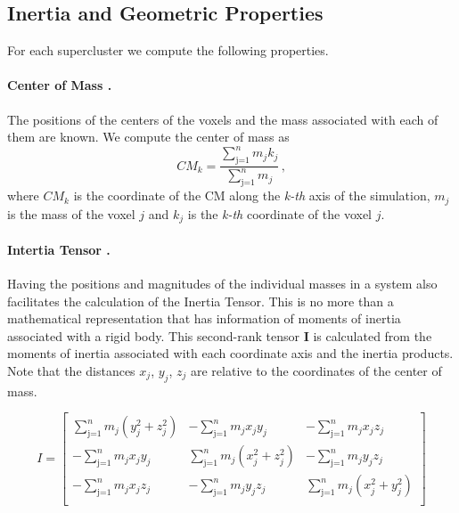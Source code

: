 \documentclass[a4paper,fleqn,usenatbib]{mnras}
\begin{document}
\subsection{Inertia and Geometric Properties}
\label{sec:IN}
For each supercluster we compute the following properties.
\paragraph{Center of Mass .} 
The positions of the centers of the voxels and the mass associated with each of them are known. We compute the center of mass as 
\begin{equation}
    CM_k = \frac{\sum\limits^{n}_{\text{j=1}} m_j k_j}{\sum\limits^{n}_{\text{j=1}} m_j} \,,
\end{equation}
where $CM_k$ is the coordinate of the CM along the \emph{k-th} axis of the simulation, $m_j$ is the mass of the voxel $j$ and $k_j$ is the \emph{k-th} coordinate of the voxel $j$. 


\paragraph{Intertia Tensor .}
Having the positions and magnitudes of the individual masses in a system also facilitates the calculation of the Inertia Tensor. This is no more than a mathematical representation that has information of moments of inertia associated with a rigid body. This second-rank tensor \textbf{I} is calculated from the moments of inertia associated with each coordinate axis and the inertia products. Note that  the distances $x_j$, $y_j$, $z_j$ are relative to the coordinates of the center of mass.

\[
  I=
  \left[ {\begin{array}{ccc}
   \sum\limits^{n}_{\text{j=1}} m_j (y_j^2 + z_j^2) & -\sum\limits^{n}_{\text{j=1}} m_j x_j y_j & -\sum\limits^{n}_{\text{j=1}} m_j x_j z_j  \\
   -\sum\limits^{n}_{\text{j=1}} m_j x_j y_j & \sum\limits^{n}_{\text{j=1}} m_j (x_j^2 + z_j^2) & -\sum\limits^{n}_{\text{j=1}} m_j y_j z_j  \\
   -\sum\limits^{n}_{\text{j=1}} m_j x_j z_j & -\sum\limits^{n}_{\text{j=1}} m_j y_j z_j & \sum\limits^{n}_{\text{j=1}} m_j (x_j^2 + y_j^2)  \\
  \end{array} } \right]
\]
\end{document}

